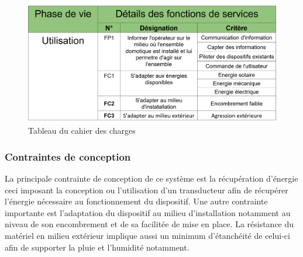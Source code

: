 \documentclass{rapportENS}
\begin{document}
  \vspace{0.5cm}
 
 \begin{figure}[h!]
    \centering
    \includegraphics[width=\linewidth]{tableau_cdcf.png}
    \vspace{0.2cm}
    \caption{Tableau du cahier des charges}
    \label{tableau_cdcf}
 \end{figure}

\subsubsection{Contraintes de conception}
La principale contrainte de conception de ce système est la récupération d'énergie ceci imposant la conception ou l'utilisation d'un transducteur afin de récupérer l'énergie nécessaire au fonctionnement du dispositif. Une autre contrainte importante est l'adaptation du dispositif au milieu d'installation notamment au niveau de son encombrement et de sa facilitée de mise en place. La résistance du matériel en milieu extérieur implique aussi un minimum d'étanchéité de celui-ci afin de supporter la pluie et l'humidité notamment.
\end{document}
